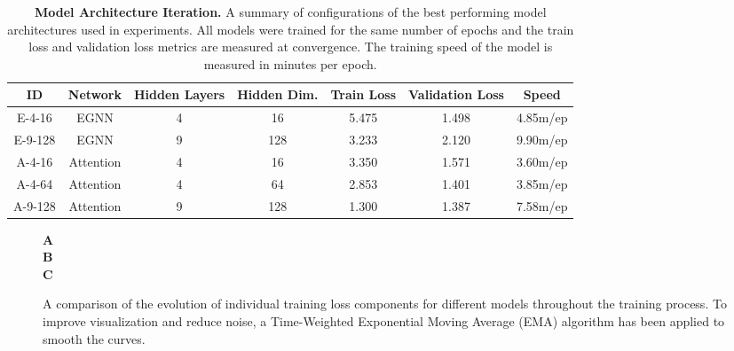 \begin{table}[ht]
\centering
\renewcommand{\arraystretch}{1.5}
\begin{tabular}{|c|c|c|c|c|c|c|}
      \hline
      \textbf{ID}      & \textbf{Network}   & \textbf{Hidden Layers} & \textbf{Hidden Dim.} & \textbf{Train Loss} & \textbf{Validation Loss} & \textbf{Speed}    \\
      \hline
      E-4-16  & EGNN      & 4             & 16          & 5.475      & 1.498           & 4.85m/ep  \\
      E-9-128 & EGNN      & 9             & 128         & 3.233      & 2.120           & 9.90m/ep  \\
      A-4-16  & Attention & 4             & 16          & 3.350      & 1.571           & 3.60m/ep  \\
      A-4-64  & Attention & 4             & 64          & 2.853      & 1.401           & 3.85m/ep  \\
      A-9-128 & Attention & 9             & 128         & 1.300      & 1.387           & 7.58m/ep  \\

      \hline
\end{tabular}
\renewcommand{\arraystretch}{1}
\caption{\textbf{Model Architecture Iteration.} A summary of configurations of the best performing model architectures used in experiments. All models were trained for the same number of epochs and the train loss and validation loss metrics are measured at convergence. The training speed of the model is measured in minutes per epoch.}  
\label{tab:iteration}
\end{table}

\begin{figure}
  \center

  \textbf{\Large A}
   \\

  \textbf{\Large B}
   \\

  \textbf{\Large C}

  \caption{A comparison of the evolution of individual training loss components for different models throughout the training process. To improve visualization and reduce noise, a Time-Weighted Exponential Moving Average (EMA) algorithm has been applied to smooth the curves.}

  \label{fig:cmp_train_metrics}
\end{figure}

